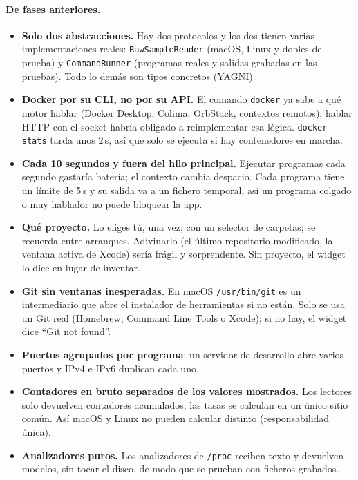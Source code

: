 \documentclass[11pt,a4paper]{article}
\begin{document}
\paragraph{De fases anteriores.}
\begin{itemize}
  \item \textbf{Solo dos abstracciones.} Hay dos protocolos y los dos
    tienen varias implementaciones reales: \texttt{RawSampleReader}
    (macOS, Linux y dobles de prueba) y \texttt{CommandRunner}
    (programas reales y salidas grabadas en las pruebas). Todo lo
    demás son tipos concretos (YAGNI).
  \item \textbf{Docker por su CLI, no por su API.} El comando
    \texttt{docker} ya sabe a qué motor hablar (Docker Desktop,
    Colima, OrbStack, contextos remotos); hablar HTTP con el socket
    habría obligado a reimplementar esa lógica. \texttt{docker stats}
    tarda unos 2\,s, así que solo se ejecuta si hay contenedores en
    marcha.
  \item \textbf{Cada 10 segundos y fuera del hilo principal.} Ejecutar
    programas cada segundo gastaría batería; el contexto cambia
    despacio. Cada programa tiene un límite de 5\,s y su salida va a
    un fichero temporal, así un programa colgado o muy hablador no
    puede bloquear la app.
  \item \textbf{Qué proyecto.} Lo eliges tú, una vez, con un selector
    de carpetas; se recuerda entre arranques. Adivinarlo (el último
    repositorio modificado, la ventana activa de Xcode) sería frágil y
    sorprendente. Sin proyecto, el widget lo dice en lugar de inventar.
  \item \textbf{Git sin ventanas inesperadas.} En macOS
    \texttt{/usr/bin/git} es un intermediario que abre el instalador
    de herramientas si no están. Solo se usa un Git real (Homebrew,
    Command Line Tools o Xcode); si no hay, el widget dice ``Git not
    found''.
  \item \textbf{Puertos agrupados por programa}: un servidor de
    desarrollo abre varios puertos y IPv4 e IPv6 duplican cada uno.
  \item \textbf{Contadores en bruto separados de los valores
    mostrados.} Los lectores solo devuelven contadores acumulados;
    las tasas se calculan en un único sitio común. Así macOS y Linux
    no pueden calcular distinto (responsabilidad única).
  \item \textbf{Analizadores puros.} Los analizadores de
    \texttt{/proc} reciben texto y devuelven modelos, sin tocar el
    disco, de modo que se prueban con ficheros grabados.

\end{itemize}
\end{document}
